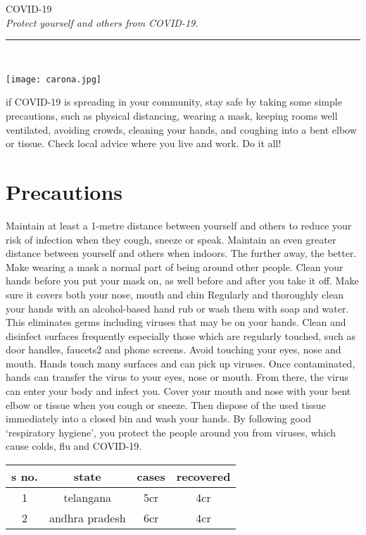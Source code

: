 \documentclass[11pt,letterpaper]{report}
\begin{document}
\begin{center}
\color{red}
        \huge{COVID-19} \\[10pt]
\color{blue}
        \large{\emph{ Protect yourself and others from COVID-19.} }
\end{center}
\rule{\textwidth}{0.2pt} \\[10pt]
\begin{minipage}{0.3\textwidth}
\texttt{[image: carona.jpg]}
\end{minipage}
\begin{minipage}{0.6\textwidth}\raggedleft
  \begin{center}
\noindent if COVID-19 is spreading in your community,
stay safe by taking some simple precautions, such as physical distancing, wearing a mask, keeping rooms well ventilated, avoiding crowds, cleaning your hands, and coughing into a bent elbow or tissue. Check local advice where you live and work. Do it all!
\end{center}
\end{minipage}
\section{Precautions}
\begin{multicols}{3}
Maintain at least a 1-metre distance between yourself and others to reduce your risk of infection when they cough, sneeze or speak. Maintain an even greater distance between yourself and others when indoors. The further away, the better. 
Make wearing a mask a normal part of being around other people. Clean your hands before you put your mask on, as well before and after you take it off. Make sure it covers both your nose, mouth and chin Regularly and thoroughly clean your hands with an alcohol-based hand rub or wash them with soap and water. This eliminates germs including viruses that may be on your hands. 
Clean and disinfect surfaces frequently especially those which are regularly touched, such as door handles, faucets2 and phone screens. Avoid touching your eyes, nose and mouth. Hands touch many surfaces and can pick up viruses. Once contaminated, hands can transfer the virus to your eyes, nose or mouth. From there, the virus can enter your body and infect you. Cover your mouth and nose with your bent elbow or tissue when you cough or sneeze. Then dispose of the used tissue immediately into a closed bin and wash your hands. By following good ‘respiratory hygiene’, you protect the people around you from viruses, which cause colds, flu and COVID-19. 
\end{multicols}
\begin{center}
\begin{tabular}{|c|c|c|c|}
\hline
s no. &state & cases & recovered \\
\hline
1 & telangana &5cr & 4cr \\
\hline
2 & andhra pradesh & 6cr &4cr \\
\hline
\end{tabular}
\end{center}
\end{document}
